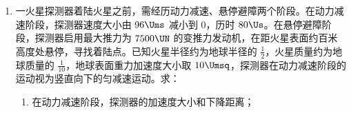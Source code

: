 \documentclass[\gkver]{gaokaozhenti}
\begin{document}
\begin{enumerate}
\begin{enumerate}
	\item
	在细绳一端挂上钩码，另一端通过定滑轮系在小车前端。
	
	\item
	把小车靠近打点计时器，接通电源，将小车由静止释放。小车拖动纸带下滑，打出的纸带一部分如图 \ref{2021福建12c} 所示。已知打点计时器所用交流电的频率为 $50 \UHz$，纸带上标出的每两个相邻计数点之间还有 4 个打出的点未画出。打出 F 点时小车的速度大小为  $\Ums[a]$（结果保留 2 位小数）。
	
	\item
	保持小车和钩码的质量不变，在小车上安装一薄板。实验近似得到的某时刻起小车 $v-t$ 图像如图 \ref{2021福建12d} 所示，由图像可知小车加速度大小 （填“逐渐变大”“逐渐变小”或“保持不变”）。据此可以得到的实验结论是 。
\end{enumerate}

{figs/12b.png}
{figs/12c.png}
{figs/12d.png}



\item
一火星探测器着陆火星之前，需经历动力减速、悬停避障两个阶段。在动力减速阶段，探测器速度大小由 $96 \Ums$ 减小到 0，历时 $80 \Us$。在悬停避障阶段，探测器启用最大推力为 $7500 \UN$ 的变推力发动机，在距火星表面约百米高度处悬停，寻找着陆点。已知火星半径约为地球半径的 $\frac{1}{2}$，火星质量约为地球质量的 $\frac{1}{10}$，地球表面重力加速度大小取 $10 \Umsq$，探测器在动力减速阶段的运动视为竖直向下的匀减速运动。求：
\begin{enumerate}
	\item
	在动力减速阶段，探测器的加速度大小和下降距离；
	

\end{enumerate}
\end{enumerate}
\end{document}
